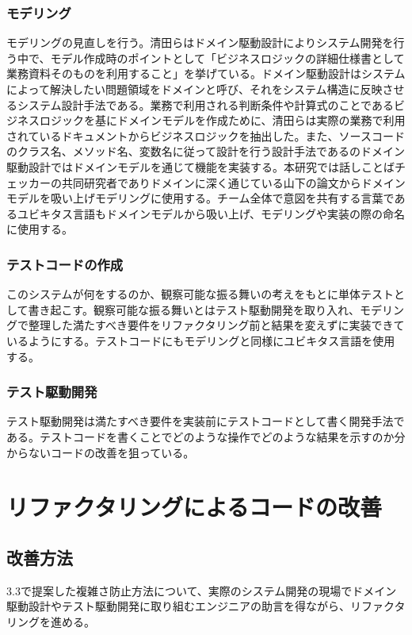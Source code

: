 \documentclass[12pt, a4paper]{jreport}
\begin{document}
\subsection{モデリング}
モデリングの見直しを行う。清田らはドメイン駆動設計によりシステム開発を行う中で、モデル作成時のポイントとして「ビジネスロジックの詳細仕様書として業務資料そのものを利用すること」を挙げている。ドメイン駆動設計はシステムによって解決したい問題領域をドメインと呼び、それをシステム構造に反映させるシステム設計手法である。業務で利用される判断条件や計算式のことであるビジネスロジックを基にドメインモデルを作成ために、清田らは実際の業務で利用されているドキュメントからビジネスロジックを抽出した。また、ソースコードのクラス名、メソッド名、変数名に従って設計を行う設計手法であるのドメイン駆動設計ではドメインモデルを通じて機能を実装する。本研究では話しことばチェッカーの共同研究者でありドメインに深く通じている山下の論文からドメインモデルを吸い上げモデリングに使用する。チーム全体で意図を共有する言葉であるユビキタス言語もドメインモデルから吸い上げ、モデリングや実装の際の命名に使用する。
\subsection{テストコードの作成}
このシステムが何をするのか、観察可能な振る舞いの考えをもとに単体テストとして書き起こす。観察可能な振る舞いとはテスト駆動開発を取り入れ、モデリングで整理した満たすべき要件をリファクタリング前と結果を変えずに実装できているようにする。テストコードにもモデリングと同様にユビキタス言語を使用する。
\subsection{テスト駆動開発}
テスト駆動開発は満たすべき要件を実装前にテストコードとして書く開発手法である。テストコードを書くことでどのような操作でどのような結果を示すのか分からないコードの改善を狙っている。
\chapter{リファクタリングによるコードの改善}
\section{改善方法}
3.3で提案した複雑さ防止方法について、実際のシステム開発の現場でドメイン駆動設計やテスト駆動開発に取り組むエンジニアの助言を得ながら、リファクタリングを進める。
\end{document}
